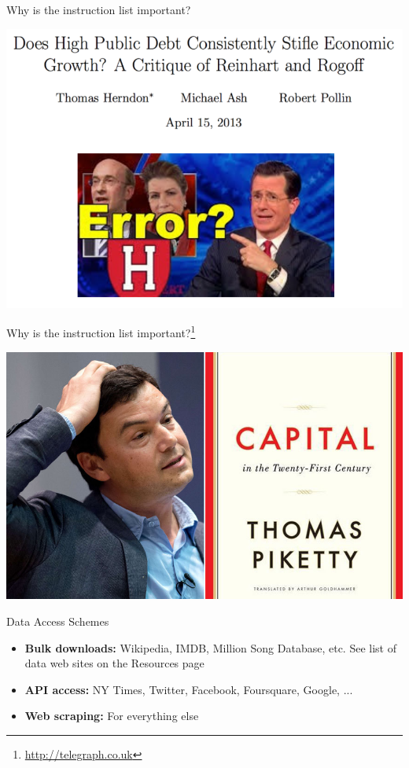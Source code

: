 \documentclass{beamer}
\newcommand{\furl}[1]{{\footnote{\url{#1}}}}
\begin{document}
\begin{frame}{Why is the instruction list important?}
    \begin{center}
        \includegraphics[scale=0.35]{rogoff.png}
    \end{center}
\end{frame}
\begin{frame}{Why is the instruction list important?\furl{http://telegraph.co.uk}}
    \begin{center}
        \includegraphics[scale=0.35]{piketty-capital-21st-century.jpg}
    \end{center}
\end{frame}

\begin{frame}{Data Access Schemes}
    \begin{itemize}
        \item {\bf Bulk downloads:} Wikipedia, IMDB, Million Song Database, etc. See list of data web sites on the Resources page
        \item {\bf API access:} NY Times, Twitter, Facebook, Foursquare, Google, ...
        \item {\bf Web scraping:} For everything else
    \end{itemize}
\end{frame}
\end{document}

